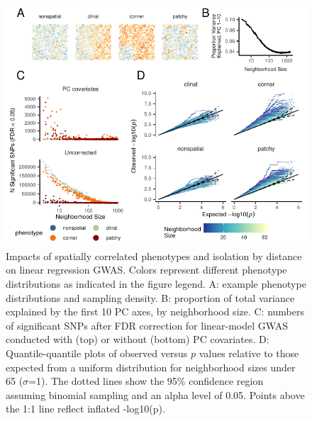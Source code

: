 \documentclass[9pt,twocolumn,twoside,lineno]{gsajnl}
\begin{document}
\afterpage{\clearpage}
\begin{figure}[p]
\centering
\includegraphics[width=\textwidth]{gwas_summary_nsig_qqplots_logX.pdf}
\caption{Impacts of spatially correlated phenotypes and isolation by distance on linear regression GWAS. Colors represent different phenotype distributions as indicated in the figure legend. A: example phenotype distributions and sampling density. B: proportion of total variance explained by the first 10 PC axes, by neighborhood size. C: numbers of significant SNPs after FDR correction for linear-model GWAS conducted with (top) or without (bottom) PC covariates. D: Quantile-quantile plots of observed versus $p$ values relative to those expected from a uniform distribution for neighborhood sizes under 65 ($\sigma$=1). The dotted lines show the 95\% confidence region assuming binomial sampling and an alpha level of 0.05. Points above the 1:1 line reflect inflated -log10(p).}
\label{fig:spectrum}
\end{figure}

\afterpage{\clearpage}


\end{document}
